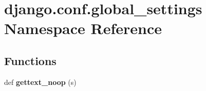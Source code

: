\hypertarget{namespacedjango_1_1conf_1_1global__settings}{}\section{django.\+conf.\+global\+\_\+settings Namespace Reference}
\label{namespacedjango_1_1conf_1_1global__settings}
\subsection*{Functions}
\begin{DoxyCompactItemize}
\item 
\mbox{\label{namespacedjango_1_1conf_1_1global__settings_a7e26dfa5acf222eb91468becaed2b2ff}} 
def {\bfseries gettext\+\_\+noop} (s)
\end{DoxyCompactItemize}
